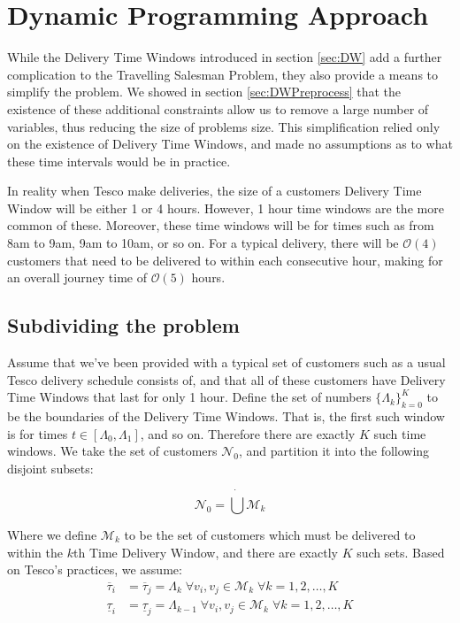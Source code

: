\section{Dynamic Programming Approach}
\label{sec:deterministic_dynamic}
\label{sef:lin_time_dep}
While the Delivery Time Windows introduced in section \ref{sec:DW} add a further complication to the Travelling Salesman Problem, they also provide a means to simplify the problem. We showed in section \ref{sec:DWPreprocess} that the existence of these additional constraints allow us to remove a large number of variables, thus reducing the size of problems size. This simplification relied only on the existence of Delivery Time Windows, and made no assumptions as to what these time intervals would be in practice.

In reality when Tesco make deliveries, the size of a customers Delivery Time Window will be either 1 or 4 hours. However, 1 hour time windows are the more common of these. Moreover, these time windows will be for times such as from 8am to 9am, 9am to 10am, or so on. For a typical delivery, there will be $\mathcal{O}(4)$ customers that need to be delivered to within each consecutive hour, making for an overall journey time of $\mathcal{O}(5)$ hours.

\subsection{Subdividing the problem}
Assume that we've been provided with a typical set of customers such as a usual Tesco delivery schedule consists of, and that all of these customers have Delivery Time Windows that last for only 1 hour. Define the set of numbers $\{\Lambda_k\}_{k = 0}^K$ to be the boundaries of the Delivery Time Windows. That is, the first such window is for times $t \in [\Lambda_0, \Lambda_1]$, and so on. Therefore there are exactly $K$ such time windows. We take the set of customers $\mathcal{N}_0$, and partition it into the following disjoint subsets:

\begin{equation*}
\mathcal{N}_0 = \dot{\bigcup}\mathcal{M}_k
\end{equation*}

Where we define $\mathcal{M}_k$ to be the set of customers which must be delivered to within the $k$th Time Delivery Window, and there are exactly $K$ such sets. Based on Tesco's practices, we assume:
\begin{align*}
\overline{\tau}_i &= \overline{\tau}_j = \Lambda_{k} \; \forall v_i,v_j \in \mathcal{M}_k\; \forall k = 1,2,\ldots, K\\
\underline{\tau}_i &= \underline{\tau}_j = \Lambda_{k-1} \; \forall v_i,v_j \in \mathcal{M}_k\; \forall k = 1,2,\ldots, K
\end{align*}


